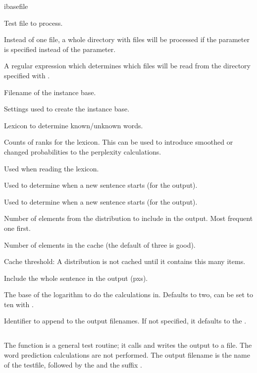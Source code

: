 \documentclass[a4paper,10pt,twoside]{report}
\begin{document}
\begin{varlist}{ibasefile}
\item[filename] Test file to process.
\item[dir] Instead of one file, a whole directory with files will be
  processed if the  parameter is specified instead of the
   parameter.
\item[dirmatch] A regular expression which determines which files will
  be read from the directory specified with .
\item[ibasefile] Filename of the instance base.
\item[timbl] Settings used to create the instance base.
\item[lexicon] Lexicon to determine known/unknown words.
\item[counts] Counts of ranks for the lexicon. This can be used to
  introduce smoothed or changed probabilities to the perplexity
  calculations. 
\item[hapax] Used when reading the lexicon.
\item[lc] Used to determine when a new sentence starts (for the
   output).
\item[rc] Used to determine when a new sentence starts (for the
   output). 
\item[topn] Number of elements from the \Timbl{} distribution to
  include in the output. Most frequent one first.
\item[cache] Number of elements in the cache (the default of three is
  good). 
\item[cth] Cache threshold: A distribution is not cached until it
  contains this many items.
\item[is] Include the whole sentence in the output (pxs).
\item[log] The base of the logarithm to do the calculations
  in. Defaults to two, can be set to ten with .
\item[id] Identifier to append to the output filenames. If not
  specified, it defaults to the \pid{}.
\end{varlist}

\subsection{}

The  function is a general test routine; it calls \Timbl{} and
writes the output to a file. The word prediction calculations are not
performed. The output filename is the name of the testfile, followed
by the  and the suffix .
\end{document}
